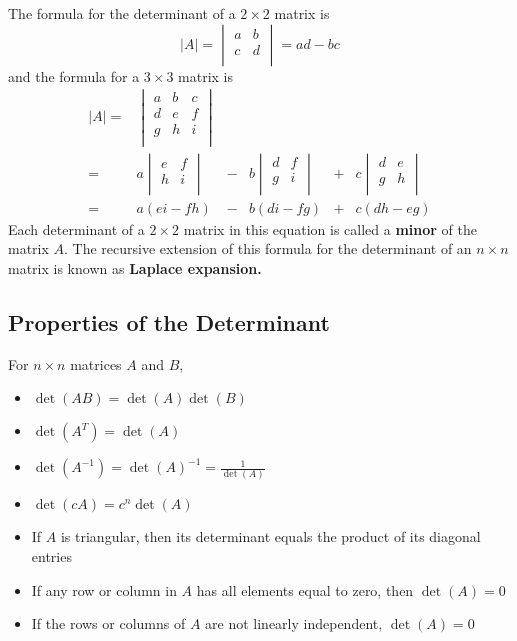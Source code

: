 \documentclass[12pt]{article}
\begin{document}
The formula for the determinant of a $2 \times 2$ matrix is $$
|A| = \begin{vmatrix}
a&b\\
c&d\\
\end{vmatrix} = ad - bc$$ and the formula for a $3 \times 3$ matrix is $$
\begin{array}{rccccc}
|A| = &\begin{vmatrix}
a&b&c\\
d&e&f\\
g&h&i\\
\end{vmatrix} & & & & \\
= & a \begin{vmatrix}
e&f\\
h&i\\
\end{vmatrix}
& - &
b \begin{vmatrix}
d&f\\
g&i\\
\end{vmatrix}
& + &
c \begin{vmatrix}
d&e\\
g&h\\
\end{vmatrix}\\
= & a(ei-fh) & - & b(di-fg) & + & c(dh-eg)
\end{array}
$$ Each determinant of a $2 \times 2$ matrix in this equation is called a \textbf{minor} of the matrix $A$. The recursive extension of this formula for the determinant of an $n \times n$ matrix is known as \textbf{Laplace expansion.} 

\subsection{Properties of the Determinant}

For $n \times n$ matrices $A$ and $B$, \begin{itemize}
\item $\det(AB) = \det(A)\det(B)$
\item $\det(A^T) = \det(A)$
\item $\det(A^{-1}) = \det(A)^{-1} = \frac{1}{\det(A)}$
\item $\det(cA) = c^n \det(A)$
\item If $A$ is triangular, then its determinant equals the product of its diagonal entries
\item If any row or column in $A$ has all elements equal to zero, then $\det(A) = 0$
\item If the rows or columns of $A$ are not linearly independent, $\det(A) = 0$
\end{itemize} 
\end{document}
